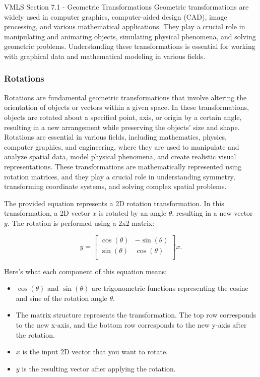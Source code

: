 \begin{notes}{VMLS Section 7.1 - Geometric Transformations}
    Geometric transformations are widely used in computer graphics, computer-aided design (CAD), image processing, and various mathematical applications. They play a crucial role in manipulating and animating 
    objects, simulating physical phenomena, and solving geometric problems. Understanding these transformations is essential for working with graphical data and mathematical modeling in various fields.

    \subsubsection*{Rotations}

    Rotations are fundamental geometric transformations that involve altering the orientation of objects or vectors within a given space. In these transformations, objects are rotated about a specified point, 
    axis, or origin by a certain angle, resulting in a new arrangement while preserving the objects' size and shape. Rotations are essential in various fields, including mathematics, physics, computer graphics, 
    and engineering, where they are used to manipulate and analyze spatial data, model physical phenomena, and create realistic visual representations. These transformations are mathematically represented using 
    rotation matrices, and they play a crucial role in understanding symmetry, transforming coordinate systems, and solving complex spatial problems.

    \begin{highlight}
        The provided equation represents a 2D rotation transformation. In this transformation, a 2D vector \(x\) is rotated by an angle \(\theta\), resulting in a new vector \(y\). The rotation is performed 
        using a 2x2 matrix:

        \begin{equation*}
            y =
            \begin{bmatrix}
                \cos{(\theta)} & -\sin{(\theta)} \\
                \sin{(\theta)} & \cos{(\theta)} \\
            \end{bmatrix}
            x.
        \end{equation*}

        Here's what each component of this equation means:

        \begin{itemize}
            \item \(\cos{(\theta)}\) and \(\sin{(\theta)}\) are trigonometric functions representing the cosine and sine of the rotation angle \(\theta\).
            \item The matrix structure represents the transformation. The top row corresponds to the new x-axis, and the bottom row corresponds to the new y-axis after the rotation.
            \item \(x\) is the input 2D vector that you want to rotate.
            \item \(y\) is the resulting vector after applying the rotation.
        \end{itemize}


\end{highlight}
\end{notes}
